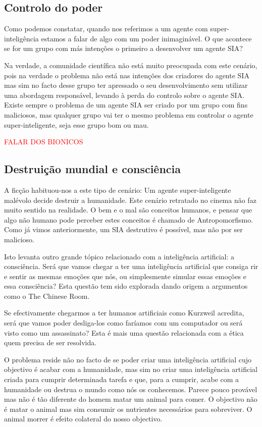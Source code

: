 \documentclass[runningheads,a4paper]{llncs}
\begin{document}
\subsection{Controlo do poder}

Como podemos constatar, quando nos referimos a um agente com super-inteligência estamos a falar de algo com um poder inimaginável. O que acontece se for um grupo com más intenções o primeiro a desenvolver um agente SIA?\@

Na verdade, a comunidade científica não está muito preocupada com este cenário, pois na verdade o problema não está nas intenções dos criadores do agente SIA mas sim no facto desse grupo ter apressado o seu desenvolvimento sem utilizar uma abordagem responsável, levando à perda do controlo sobre o agente SIA\@. Existe sempre o problema de um agente SIA ser criado por um grupo com fins maliciosos, mas qualquer grupo vai ter o mesmo problema em controlar o agente super-inteligente, seja esse grupo bom ou mau.

\textcolor{red}{FALAR DOS BIONICOS}

\subsection{Destruição mundial e consciência}

A ficção habituou-nos a este tipo de cenário: Um agente super-inteligente malévolo decide destruir a humanidade. Este cenário retratado no cinema não faz muito sentido na realidade. O bem e o mal são conceitos humanos, e pensar que algo não humano pode perceber estes conceitos é chamado de Antropomorfismo. Como já vimos anteriormente, um SIA destrutivo é possível, mas não por ser malicioso.

Isto levanta outro grande tópico relacionado com a inteligência artificial: a consciência. Será que vamos chegar a ter uma inteligência artificial que consiga rir e sentir as mesmas emoções que nós, ou simplesmente simular essas emoções e essa consciência? Esta questão tem sido explorada dando origem a argumentos como o The Chinese Room\cite{chineseroom}.

Se efectivamente chegarmos a ter humanos artificiais como Kurzweil acredita, será que vamos poder desliga-los como faríamos com um computador ou será visto como um assassinato? Esta é mais uma questão relacionada com a ética quem precisa de ser resolvida.

O problema reside não no facto de se poder criar uma inteligência artificial cujo objectivo é acabar com a humanidade, mas sim no criar uma inteligência artificial criada para cumprir determinada tarefa e que, para a cumprir, acabe com a humanidade ou destrua o mundo como nós os conhecemos. Parece pouco provável mas não é tão diferente do homem matar um animal para comer. O objectivo não é matar o animal mas sim consumir os nutrientes necessários para sobreviver. O animal morrer é efeito colateral do nosso objectivo.
\end{document}
